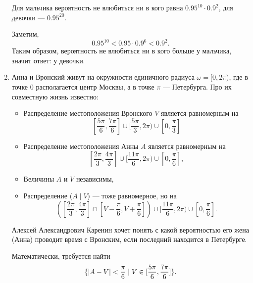 \documentclass[12pt]{article}
\let\P\relax
\DeclareMathOperator{\P}{\mathbb{P}}
\begin{document}
\begin{enumerate}[resume]
Для мальчика вероятность не влюбиться ни в кого равна $0.95^{10}\cdot 0.9^2$, для девочки — $0.95^{20}$. 

Заметим,
\[
   0.95^{10} < 0.95\cdot 0.9^6 < 0.9^2.
\]
Таким образом, вероятность не влюбиться ни в кого больше у мальчика, значит ответ: у девочки.

\item Анна и Вронский живут на окружности единичного радиуса $\omega=[0, 2\pi)$, где в точке $0$ располагается центр Москвы, а в точке $\pi$ — Петербурга. 
Про их совместную жизнь известно:
\begin{itemize}
    \item Распределение местоположения Вронского $V$ является равномерным на
    \[
        [\frac{5\pi}{6}, \frac{7\pi}{6}]\cup[\frac{5\pi}{3}, 2\pi)\cup [0, \frac{\pi}{3}]
    \]
    \item Распределение местоположения Анны $A$ является равномерным на
    \[
        [\frac{2\pi}{3}, \frac{4\pi}{3}]\cup[\frac{11\pi}{6}, 2\pi)\cup[0, \frac{\pi}{6}],
    \]
    \item Величины $A$ и $V$ независимы, 
    \item Распределение ($A\;|\;V$) — тоже равномерное, но на
    \[
        \left([\frac{2\pi}{3}, \frac{4\pi}{3}]\cap[V-\frac{\pi}{6}, V+\frac{\pi}{6}]\right)\cup[\frac{11\pi}{6}, 2\pi)\cup[0, \frac{\pi}{6}].
    \]
\end{itemize}


Алексей Александрович Каренин хочет понять
    с какой вероятностью его жена (Анна) проводит время с Вронским, если последний находится в Петербурге.

    Математически, требуется найти
    \[
        \P\{|A-V|<\frac{\pi}{6}\;|\;V\in[\frac{5\pi}{6}, \frac{7\pi}{6}]\}.
    \]


\end{enumerate}
\end{document}
